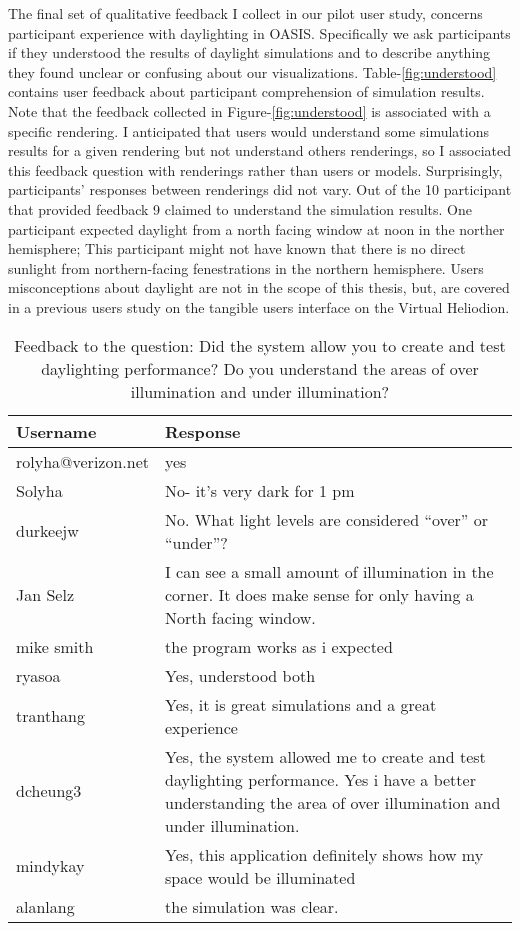 The final set of qualitative feedback I collect in our pilot user study, concerns participant experience with daylighting in OASIS.
Specifically we ask participants if they understood the results of daylight simulations and to describe anything they found unclear or confusing about our visualizations.
Table-\ref{fig:understood} contains user feedback about participant comprehension of simulation results.
Note that the feedback collected in Figure-\ref{fig:understood} is associated with a specific rendering.
I anticipated that users would understand some simulations results for a given rendering but not understand others renderings, so I associated this feedback question with renderings rather than users or models.
Surprisingly, participants' responses between renderings did not vary. 
Out of the 10 participant that provided feedback 9 claimed to understand the simulation results.
One participant expected daylight from a north facing window at noon in the norther hemisphere;
This participant might not have known that there is no direct sunlight from northern-facing fenestrations in the northern hemisphere.
Users misconceptions about daylight are not in the scope of this thesis, but, are covered in a previous users study on the tangible users interface on the Virtual Heliodion\cite{}.


\begin{table}[h]
\centering
\begin{tabular}{|p{}|p{}|}
\hline
\rowcolor[HTML]{EFEFEF} 
\textbf{Username} & \textbf{Response} \\ \hline
rolyha@verizon.net & yes \\ \hline
Solyha & No- it's very dark for 1 pm \\ \hline
durkeejw & No. What light levels are considered ``over'' or ``under''? \\ \hline
Jan Selz & I can see a small amount of illumination in the corner.  It does make sense for only having a North facing window. \\ \hline
mike smith & the program works as i expected \\ \hline
ryasoa & Yes, understood both \\ \hline
tranthang & Yes, it is great simulations and a great experience \\ \hline
dcheung3 & Yes, the system allowed me to create and test daylighting performance. Yes i have a better understanding the area of over illumination and under illumination. \\ \hline
mindykay & Yes, this application definitely shows how my space would be illuminated \\ \hline
alanlang & the simulation was clear. \\ \hline
\end{tabular}
\caption{Feedback to the question: Did the system allow you to create and test daylighting performance? Do you understand the areas of over illumination and under illumination?}
\label{fig:effective}
\end{table}

